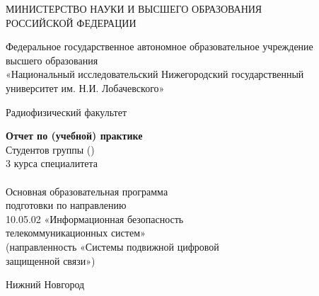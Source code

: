 \begin{titlepage}
	\centering

	МИНИСТЕРСТВО НАУКИ И ВЫСШЕГО ОБРАЗОВАНИЯ \\
	РОССИЙСКОЙ ФЕДЕРАЦИИ

	\vspace{1em}
	Федеральное государственное автономное образовательное учреждение \\
	высшего образования \\
	«Национальный исследовательский Нижегородский государственный \\
	университет им. Н.И. Лобачевского»

	\vspace{1em}
	Радиофизический факультет

	\vfill
	\begin{minipage}{0.8\linewidth}
		\centering\large\bfseries\MakeUppercase{\labtheme}
	\end{minipage}

	\vfill
	\begin{flushright}
		\begin{minipage}{0.5\textwidth}
			\raggedright
			{\bfseries Отчет по (учебной) практике}\\
			Студентов группы \labgroupshort (\labgroupfull)\\
			3 курса специалитета\\
			\labauthors \\
			\vspace{1em}
			Основная образовательная программа\\
			подготовки по направлению\\
			10.05.02 «Информационная безопасность\\
			телекоммуникационных систем»\\
			(направленность «Системы подвижной цифровой\\
			защищенной связи»)
		\end{minipage}
	\end{flushright}

	\vfill
	Нижний Новгород \the\year{}
\end{titlepage}